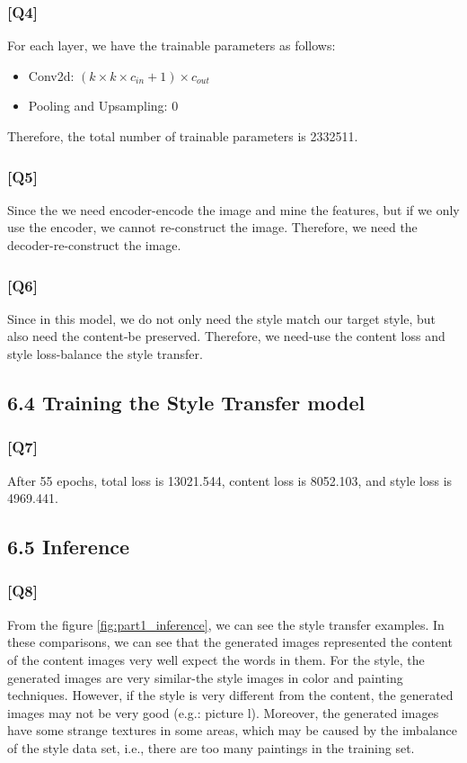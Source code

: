 \documentclass{article}
\begin{document}
\subsubsection*{[Q4]}
For each layer, we have the trainable parameters as follows:
\begin{itemize}
    \item Conv2d: $(k \times k \times c_{in} + 1) \times c_{out}$
    \item Pooling and Upsampling: 0
\end{itemize}

Therefore, the total number of trainable parameters is 2332511.

\subsubsection*{[Q5]}
Since the we need encoder-encode the image and mine the features, but if we only use the encoder, we cannot re-construct the image. 
Therefore, we need the decoder-re-construct the image.

\subsubsection*{[Q6]}
Since in this model, we do not only need the style match our target style, but also need the content-be preserved.
Therefore, we need-use the content loss and style loss-balance the style transfer.

\subsection*{6.4 Training the Style Transfer model}

\subsubsection*{[Q7]}

After 55 epochs, total loss is 13021.544, content loss is 8052.103, and style loss is 4969.441.

\subsection*{6.5 Inference}

\subsubsection*{[Q8]}

From the figure \ref{fig:part1_inference}, we can see the style transfer examples.
In these comparisons, we can see that the generated images represented the content of the content images very well expect the words in them.
For the style, the generated images are very similar-the style images in color and painting techniques.
However, if the style is very different from the content, the generated images may not be very good (e.g.: picture l).
Moreover, the generated images have some strange textures in some areas, which may be caused by the imbalance of the style data set, i.e., there are too many paintings in the training set.
\end{document}
